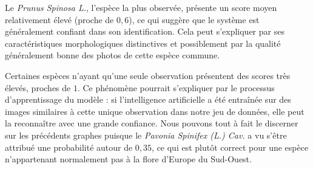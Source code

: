 \documentclass[a4paper,12pt]{article}
\begin{document}
\vspace{0.2cm}

Le \textit{Prunus Spinosa L.}, l'espèce la plus observée, présente un score moyen relativement élevé (proche de $0,6$), ce qui suggère que le système est généralement confiant dans son identification. Cela peut s'expliquer par ses caractéristiques morphologiques distinctives et possiblement par la qualité généralement bonne des photos de cette espèce commune.

\vspace{0.2cm}

Certaines espèces n'ayant qu'une seule observation présentent des scores très élevés, proches de $1$. Ce phénomène pourrait s'expliquer par le processus d'apprentissage du modèle : si l'intelligence artificielle a été entraînée sur des images similaires à cette unique observation dans notre jeu de données, elle peut la reconnaître avec une grande confiance. Nous pouvons tout à fait le discerner sur les précédents graphes puisque le \textit{Pavonia Spinifex (L.) Cav.} a vu s'être attribué une probabilité autour de $0,35$, ce qui est plutôt correct pour une espèce n'appartenant normalement pas à la flore d'Europe du Sud-Ouest.

\end{document}
